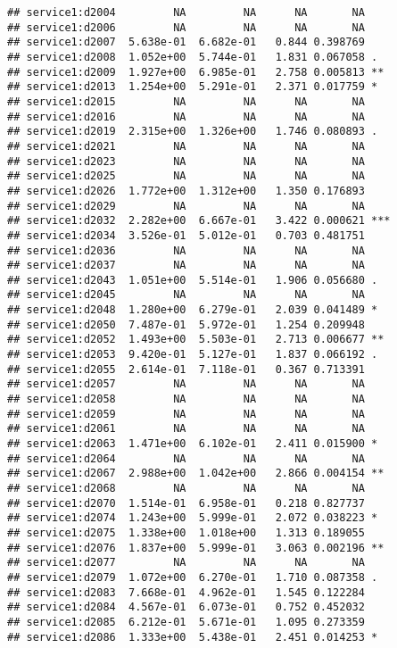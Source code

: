\documentclass[
]{article}
\begin{document}
\begin{verbatim}
## service1:d2004         NA         NA      NA       NA    
## service1:d2006         NA         NA      NA       NA    
## service1:d2007  5.638e-01  6.682e-01   0.844 0.398769    
## service1:d2008  1.052e+00  5.744e-01   1.831 0.067058 .  
## service1:d2009  1.927e+00  6.985e-01   2.758 0.005813 ** 
## service1:d2013  1.254e+00  5.291e-01   2.371 0.017759 *  
## service1:d2015         NA         NA      NA       NA    
## service1:d2016         NA         NA      NA       NA    
## service1:d2019  2.315e+00  1.326e+00   1.746 0.080893 .  
## service1:d2021         NA         NA      NA       NA    
## service1:d2023         NA         NA      NA       NA    
## service1:d2025         NA         NA      NA       NA    
## service1:d2026  1.772e+00  1.312e+00   1.350 0.176893    
## service1:d2029         NA         NA      NA       NA    
## service1:d2032  2.282e+00  6.667e-01   3.422 0.000621 ***
## service1:d2034  3.526e-01  5.012e-01   0.703 0.481751    
## service1:d2036         NA         NA      NA       NA    
## service1:d2037         NA         NA      NA       NA    
## service1:d2043  1.051e+00  5.514e-01   1.906 0.056680 .  
## service1:d2045         NA         NA      NA       NA    
## service1:d2048  1.280e+00  6.279e-01   2.039 0.041489 *  
## service1:d2050  7.487e-01  5.972e-01   1.254 0.209948    
## service1:d2052  1.493e+00  5.503e-01   2.713 0.006677 ** 
## service1:d2053  9.420e-01  5.127e-01   1.837 0.066192 .  
## service1:d2055  2.614e-01  7.118e-01   0.367 0.713391    
## service1:d2057         NA         NA      NA       NA    
## service1:d2058         NA         NA      NA       NA    
## service1:d2059         NA         NA      NA       NA    
## service1:d2061         NA         NA      NA       NA    
## service1:d2063  1.471e+00  6.102e-01   2.411 0.015900 *  
## service1:d2064         NA         NA      NA       NA    
## service1:d2067  2.988e+00  1.042e+00   2.866 0.004154 ** 
## service1:d2068         NA         NA      NA       NA    
## service1:d2070  1.514e-01  6.958e-01   0.218 0.827737    
## service1:d2074  1.243e+00  5.999e-01   2.072 0.038223 *  
## service1:d2075  1.338e+00  1.018e+00   1.313 0.189055    
## service1:d2076  1.837e+00  5.999e-01   3.063 0.002196 ** 
## service1:d2077         NA         NA      NA       NA    
## service1:d2079  1.072e+00  6.270e-01   1.710 0.087358 .  
## service1:d2083  7.668e-01  4.962e-01   1.545 0.122284    
## service1:d2084  4.567e-01  6.073e-01   0.752 0.452032    
## service1:d2085  6.212e-01  5.671e-01   1.095 0.273359    
## service1:d2086  1.333e+00  5.438e-01   2.451 0.014253 *  

\end{verbatim}
\end{document}
